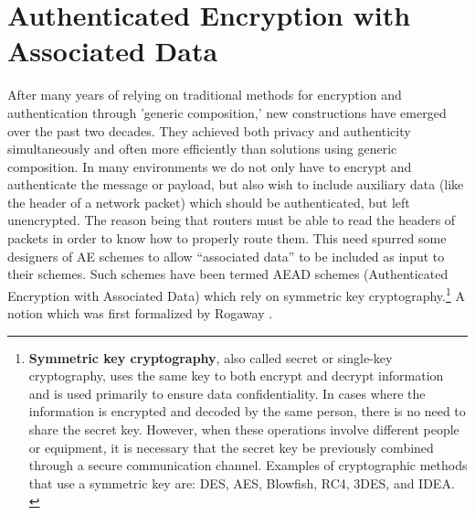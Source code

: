 \section{Authenticated Encryption with Associated Data}
After many years of relying on traditional methods for encryption and authentication through 'generic composition,' new constructions have emerged over the past two decades. They achieved both privacy and authenticity simultaneously and often more efficiently than solutions using generic composition.
\newline
In many environments we do not only have to encrypt and authenticate the message or payload, but also wish to include auxiliary data (like the header of a network packet) which should be authenticated, but left unencrypted. \cite[Chapter 1]{Black2005}
The reason being that routers must be able to read the headers of packets in order to know how to properly route them. This need spurred some designers of AE schemes to allow “associated data” to be included as input to their schemes. Such schemes have been termed AEAD schemes (Authenticated Encryption with Associated Data) which rely on symmetric key cryptography.\footnote[1]{\textbf{Symmetric key cryptography}, also called secret or single-key cryptography, uses the same key to both encrypt and decrypt information and is used primarily to ensure data confidentiality. In cases where the information is encrypted and decoded by the same person, there is no need to share the secret key. However, when these operations involve different people or equipment, it is necessary that the secret key be previously combined through a secure communication channel. Examples of cryptographic methods that use a symmetric key are: DES, AES, Blowfish, RC4, 3DES, and IDEA. \cite{Alencar2022Cryptography}}
A notion which was first formalized by Rogaway \cite{10.1145/586110.586125}.



